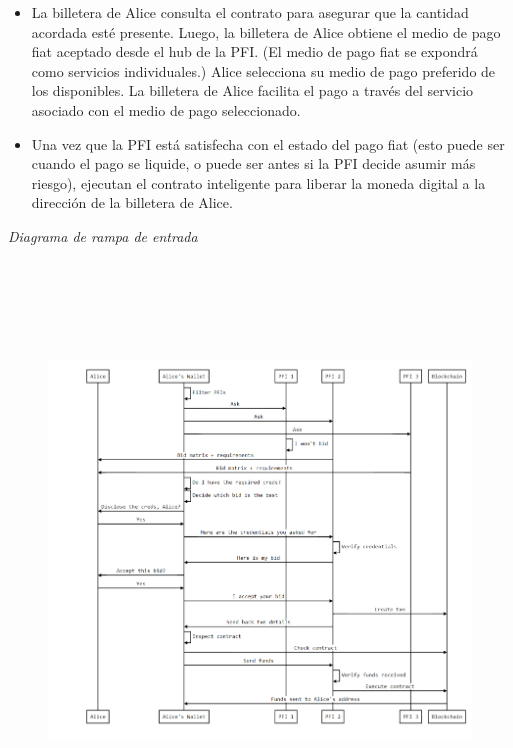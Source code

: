 \documentclass[11pt]{article}
\begin{document}
\begin{itemize}
	\item La billetera de Alice consulta el contrato para asegurar que la cantidad acordada esté presente. Luego, la billetera de Alice obtiene el medio de pago fiat aceptado desde el hub de la PFI. (El medio de pago fiat se expondrá como servicios individuales.) Alice selecciona su medio de pago preferido de los disponibles. La billetera de Alice facilita el pago a través del servicio asociado con el medio de pago seleccionado.

	\item Una vez que la PFI está satisfecha con el estado del pago fiat (esto puede ser cuando el pago se liquide, o puede ser antes si la PFI decide asumir más riesgo), ejecutan el contrato inteligente para liberar la moneda digital a la dirección de la billetera de Alice.

\vspace{1\baselineskip}
\end{itemize}
\begin{center}
\textit{Diagrama de rampa de entrada}
\end{center}



\vspace{1\baselineskip}
\begin{figure}[H]
\centering
\includegraphics[width=16.4cm,height=15.3cm]{./diagrams/on-ramp.png}
\end{figure}
\end{document}

